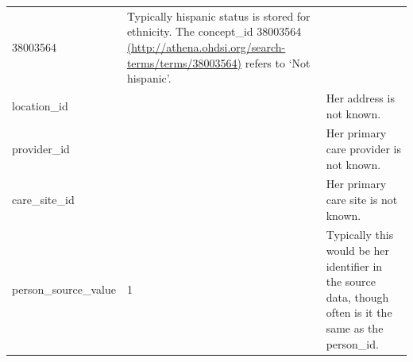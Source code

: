 \documentclass[]{book}
\begin{document}
\begin{longtable}[]{@{}lll@{}}
\begin{minipage}[t]{0.15\columnwidth}
38003564\strut
\end{minipage} & \begin{minipage}[t]{0.43\columnwidth}\raggedright
Typically hispanic status is stored for ethnicity. The concept\_id 38003564 \href{http://athena.ohdsi.org/search-terms/terms/38003564}{(http://athena.ohdsi.org/search-terms/terms/38003564)} refers to `Not hispanic'.\strut
\end{minipage}\tabularnewline
\begin{minipage}[t]{0.33\columnwidth}\raggedright
location\_id\strut
\end{minipage} & \begin{minipage}[t]{0.15\columnwidth}\raggedright
\strut
\end{minipage} & \begin{minipage}[t]{0.43\columnwidth}\raggedright
Her address is not known.\strut
\end{minipage}\tabularnewline
\begin{minipage}[t]{0.33\columnwidth}\raggedright
provider\_id\strut
\end{minipage} & \begin{minipage}[t]{0.15\columnwidth}\raggedright
\strut
\end{minipage} & \begin{minipage}[t]{0.43\columnwidth}\raggedright
Her primary care provider is not known.\strut
\end{minipage}\tabularnewline
\begin{minipage}[t]{0.33\columnwidth}\raggedright
care\_site\_id\strut
\end{minipage} & \begin{minipage}[t]{0.15\columnwidth}\raggedright
\strut
\end{minipage} & \begin{minipage}[t]{0.43\columnwidth}\raggedright
Her primary care site is not known.\strut
\end{minipage}\tabularnewline
\begin{minipage}[t]{0.33\columnwidth}\raggedright
person\_source\_value\strut
\end{minipage} & \begin{minipage}[t]{0.15\columnwidth}\raggedright
1\strut
\end{minipage} & \begin{minipage}[t]{0.43\columnwidth}\raggedright
Typically this would be her identifier in the source data, though often is it the same as the person\_id.\strut
\end{minipage}\tabularnewline

\end{longtable}
\end{document}
